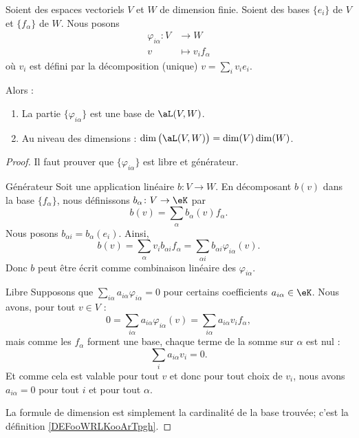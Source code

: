\begin{lemma}       \label{LEMooJXFIooKDzRWR}
	Soient des espaces vectoriels \( V\) et \( W\) de dimension finie. Soient des bases \( \{e_i\}\) de \( V\) et \( \{f_{\alpha}\}\) de \( W\). Nous posons
	\begin{equation}
		\begin{aligned}
			\varphi_{i\alpha}\colon V & \to W                 \\
			v                         & \mapsto v_if_{\alpha}
		\end{aligned}
	\end{equation}
	où \( v_i\) est défini par la décomposition (unique) \( v=\sum_iv_ie_i\).

	Alors :
	\begin{enumerate}
		\item
		      La partie \( \{\varphi_{i\alpha}\} \) est une base de \( \aL(V,W)\).
		\item       \label{ITEMooPMLWooNbTyJI}
		      Au niveau des dimensions : \( \dim\big( \aL(V,W) \big)=\dim(V)\dim(W)\).
	\end{enumerate}
\end{lemma}

\begin{proof}
	Il faut prouver que \( \{\varphi_{i\alpha}\}\) est libre et générateur.

	\begin{subproof}
		\item[Générateur]
		Soit une application linéaire \( b\colon V\to W\). En décomposant \( b(v)\) dans la base \( \{f_{\alpha}\}\), nous définissons \( b_{\alpha}\colon V\to \eK\) par
		\begin{equation}
			b(v)=\sum_{\alpha}b_{\alpha}(v)f_{\alpha}.
		\end{equation}
		Nous posons \( b_{\alpha i}=b_{\alpha}(e_i)\). Ainsi,
		\begin{equation}
			b(v)=\sum_{\alpha}v_ib_{\alpha i}f_{\alpha}=\sum_{\alpha i}b_{\alpha i}\varphi_{i\alpha}(v).
		\end{equation}
		Donc \( b\) peut être écrit comme combinaison linéaire des \( \varphi_{i\alpha}\).

		\item[Libre]
		Supposons que \( \sum_{i\alpha}a_{i\alpha}\varphi_{i\alpha}=0\) pour certains coefficients \( a_{i\alpha}\in \eK\). Nous avons, pour tout \( v\in V\) :
		\begin{equation}
			0=\sum_{i\alpha}a_{i\alpha}\varphi_{i\alpha}(v)=\sum_{i\alpha}a_{i\alpha}v_if_{\alpha},
		\end{equation}
		mais comme les \( f_{\alpha}\) forment une base, chaque terme de la somme sur \( \alpha\) est nul :
		\begin{equation}
			\sum_ia_{i\alpha}v_i=0.
		\end{equation}
		Et comme cela est valable pour tout \( v\) et donc pour tout choix de \( v_i\), nous avons \( a_{i\alpha}=0\) pour tout \( i\) et pour tout \( \alpha\).
	\end{subproof}
	La formule de dimension est simplement la cardinalité de la base trouvée; c'est la définition \ref{DEFooWRLKooArTpgh}.
\end{proof}

